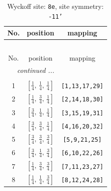 \documentclass[fleqn,8pt]{jsarticle}
\begin{document}
\renewcommand{\arraystretch}{1.2}
\begin{longtable}{ccc}
\caption{Wyckoff site: {\tt 8e}, site symmetry: {\tt -11'}}
 \\
 \hline \hline
No. & position & mapping \\ \hline \endfirsthead

\multicolumn{2}{l}{\tablename\ \thetable{}} \\
 \hline \hline
No. & position & mapping \\ \hline \endhead

 \hline \hline
\multicolumn{2}{r}{\footnotesize\it continued ...} \\ \endfoot

 \hline \hline
\multicolumn{2}{r}{} \\ \endlastfoot

1 & $\left[ \frac{1}{4},\, \frac{1}{4},\, \frac{1}{4} \right]$ & {\tt [1,13,17,29]} \\ \hline
2 & $\left[ \frac{1}{4},\, \frac{3}{4},\, \frac{1}{4} \right]$ & {\tt [2,14,18,30]} \\ \hline
3 & $\left[ \frac{3}{4},\, \frac{1}{4},\, \frac{1}{4} \right]$ & {\tt [3,15,19,31]} \\ \hline
4 & $\left[ \frac{3}{4},\, \frac{3}{4},\, \frac{1}{4} \right]$ & {\tt [4,16,20,32]} \\ \hline
5 & $\left[ \frac{3}{4},\, \frac{3}{4},\, \frac{3}{4} \right]$ & {\tt [5,9,21,25]} \\ \hline
6 & $\left[ \frac{3}{4},\, \frac{1}{4},\, \frac{3}{4} \right]$ & {\tt [6,10,22,26]} \\ \hline
7 & $\left[ \frac{1}{4},\, \frac{3}{4},\, \frac{3}{4} \right]$ & {\tt [7,11,23,27]} \\ \hline
8 & $\left[ \frac{1}{4},\, \frac{1}{4},\, \frac{3}{4} \right]$ & {\tt [8,12,24,28]} \\
\end{longtable}
\renewcommand{\arraystretch}{1.2}
\end{document}
